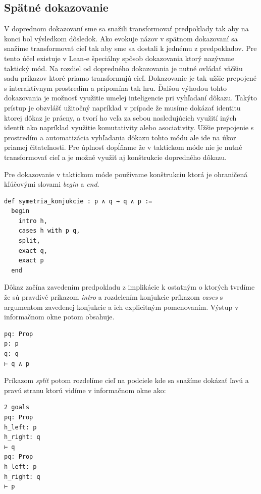 \documentclass[a4paper,10pt,oneside]{report}%
\begin{document}
\subsection{Spätné dokazovanie}

    V doprednom dokazovaní sme sa snažili transformovať predpoklady tak aby na konci
bol výsledkom dôsledok.
    Ako evokuje názov v spätnom dokazovaní sa snažíme transformovať cieľ tak aby sme
sa dostali k jednému z predpokladov.
    Pre tento účel existuje v Lean-e špeciálny spôsob dokazovania ktorý nazývame taktický
mód.
    Na rozdiel od dopredného dokazovania je nutné ovládať väčšiu sadu príkazov ktoré
priamo transformujú cieľ.
    Dokazovanie je tak užšie prepojené s interaktívnym prostredím a pripomína tak hru.
    Ďalšou výhodou tohto dokazovania je možnosť využitie umelej inteligencie pri vyhľadaní
dôkazu.
    Takýto prístup je obzvlášť užitočný napríklad v prípade že musíme dokázať identitu
ktorej dôkaz je prácny, a tvorí ho veľa za sebou nasledujúcich využití iných
identít ako napríklad využitie komutativity alebo asociativity.
    Užšie prepojenie s prostredím a automatizácia vyhľadania dôkazu tohto módu ale
ide na úkor priamej čitateľnosti.
    Pre úplnosť dopĺňame že v taktickom móde nie je nutné transformovať cieľ a je možné
využiť aj konštrukcie dopredného dôkazu.

    Pre dokazovanie v taktickom móde používame konštrukciu ktorá je ohraničená
kľúčovými slovami \emph{begin} a \emph{end}.

\begin{lstlisting}
def symetria_konjukcie : p ∧ q → q ∧ p :=
  begin
    intro h,
    cases h with p q,
    split,
    exact q,
    exact p
  end
\end{lstlisting}

    Dôkaz začína zavedením predpokladu z implikácie k ostatným o ktorých tvrdíme
že sú pravdivé príkazom \emph{intro} a rozdelením konjukcie príkazom \emph{cases}
s argumentom zavedenej konjukcie a ich explicitným pomenovaním.
    Výstup v informačnom okne potom obsahuje.

\begin{lstlisting}
pq: Prop
p: p
q: q
⊢ q ∧ p
\end{lstlisting}

Príkazom \emph{split} potom rozdelíme cieľ na podciele kde sa snažíme dokázať
ľavú a pravú stranu ktorú vidíme v informačnom okne ako:

\begin{lstlisting}
2 goals
pq: Prop
h_left: p
h_right: q
⊢ q
pq: Prop
h_left: p
h_right: q
⊢ p
\end{lstlisting}
\end{document}
